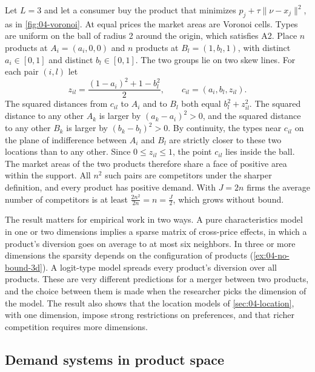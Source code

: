 \begin{example}\label{ex:04-no-bound-3d}
Let $L = 3$ and let a consumer buy the product that minimizes $p_j + \tau\|\nu - x_j\|^2$, as in
\cref{fig:04-voronoi}. At equal prices the market areas are Voronoi cells. Types are uniform on the ball of
radius 2 around the origin, which satisfies A2.
Place $n$ products at $A_i = (a_i, 0, 0)$ and $n$ products at $B_l = (1, b_l, 1)$, with distinct $a_i \in [0, 1]$
and distinct $b_l \in [0, 1]$. The two groups lie on two skew lines. For each pair $(i, l)$ let
\begin{equation*}
z_{il} = \frac{(1 - a_i)^2 + 1 - b_l^2}{2}, \qquad c_{il} = (a_i, b_l, z_{il}).
\end{equation*}
The squared distances from $c_{il}$ to $A_i$ and to $B_l$ both equal $b_l^2 + z_{il}^2$. The squared distance to
any other $A_k$ is larger by $(a_k - a_i)^2 > 0$, and the squared distance to any other $B_k$ is larger by
$(b_k - b_l)^2 > 0$. By continuity, the types near $c_{il}$ on the plane of indifference between $A_i$ and $B_l$
are strictly closer to these two locations than to any other. Since $0 \leq z_{il} \leq 1$, the point $c_{il}$
lies inside the ball. The market areas of the two products therefore share a face of positive area within the
support. All $n^2$ such pairs are competitors under the sharper definition, and every product has positive
demand. With $J = 2n$ firms the average number of competitors is at least $\frac{2n^2}{2n} = n = \frac{J}{2}$,
which grows without bound.
\end{example}

The result matters for empirical work in two ways. A pure characteristics model in one or two dimensions implies a
sparse matrix of cross-price effects, in which a product's diversion goes on average to at most six neighbors. In
three or more dimensions the sparsity depends on the configuration of products (\cref{ex:04-no-bound-3d}). A logit-type model
spreads every product's diversion over all products. These are very different predictions for a merger between
two products, and the choice between them is made when the researcher picks the dimension of the model. The result
also shows that the location models of \cref{sec:04-location}, with one dimension, impose strong restrictions on
preferences, and that richer competition requires more dimensions.

\subsection{Demand systems in product space}\label{sec:04-spaces-product}


